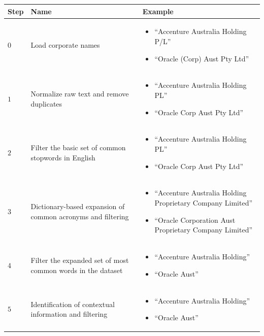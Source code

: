 \documentclass{llncs}
\begin{document}
\begin{table}[!htb]
\renewcommand{\arraystretch}{1.3}
\begin{center}
\begin{tabular}{|p{1cm}|p{5.5cm}|p{5.5cm}|}
\hline

  \textbf{Step} & \textbf{Name} & \textbf{Example}  \\  \hline
  $0$ & Load corporate names & \begin{itemize} \item  ``Accenture  Australia Holding P/L'' \item  ``Oracle (Corp) Aust Pty Ltd''  \end{itemize} \\ \hline
  $1$ & Normalize raw text and remove duplicates & \begin{itemize} \item  ``Accenture  Australia Holding PL'' \item  ``Oracle Corp Aust Pty Ltd'' \end{itemize} \\ \hline
  $2$ & Filter the basic set of common stopwords in English & \begin{itemize} \item  ``Accenture  Australia Holding PL'' \item  ``Oracle Corp Aust Pty Ltd'' \end{itemize} \\ \hline  
  $3$ & Dictionary-based expansion of common acronyms and filtering & \begin{itemize} \item  ``Accenture  Australia Holding Proprietary Company Limited'' \item  ``Oracle Corporation Aust Proprietary Company Limited'' \end{itemize} \\ \hline
  $4$ & Filter the expanded set of most common words in the dataset & \begin{itemize} \item  ``Accenture  Australia Holding'' \item  ``Oracle Aust'' \end{itemize} \\ \hline
  $5$ & Identification of contextual information and filtering & \begin{itemize} \item  ``Accenture  Australia Holding'' \item  ``Oracle Aust'' \end{itemize}\\ \hline

\end{tabular}
\end{center}
\end{table}
\end{document}
